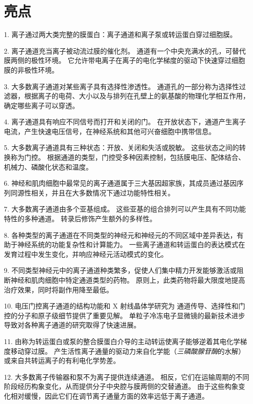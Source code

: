 


\section{亮点}


1. 离子通过两大类完整的膜蛋白：离子通道和离子泵或转运蛋白穿过细胞膜。


2. 离子通道充当离子被动流过膜的催化剂。
通道有一个中央充满水的孔，可替代膜两侧的极性环境。 
它允许带电离子在离子的电化学梯度的驱动下快速穿过细胞膜的非极性环境。


3. 大多数离子通道对某些离子具有选择性渗透性。
通道孔的一部分称为选择性过滤器，根据离子的电荷、大小以及与排列在孔壁上的氨基酸的物理化学相互作用，确定哪些离子可以穿透。


4. 离子通道具有响应不同信号而打开和关闭的门。
在开放状态下，通道产生离子电流，产生快速电压信号，在神经系统和其他可兴奋细胞中携带信息。


5. 大多数离子通道具有三种状态：开放、关闭和失活或脱敏。
这些状态之间的转换称为门控。
根据通道的类型，门控受多种因素控制，包括膜电压、配体结合、机械力、磷酸化状态和温度。


6. 神经和肌肉细胞中最常见的离子通道属于三大基因超家族，其成员通过基因序列同源性相关，并且在大多数情况下通过功能特性相关。


7. 大多数离子通道由多个亚基组成。
这些亚基的组合排列可以产生具有不同功能特性的多种通道。 转录后修饰产生额外的多样性。


8. 各种类型的离子通道在不同类型的神经元和神经元的不同区域中差异表达，有助于神经系统的功能复杂性和计算能力。
一些离子通道和转运蛋白的表达模式在发育过程中发生变化，并响应神经元活动模式的变化。


9. 不同类型神经元中的离子通道种类繁多，促使人们集中精力开发能够激活或阻断神经和肌肉细胞中特定通道类型的药物。
原则上，此类药物将最大限度地提高治疗效果，同时将副作用降至最低。


10. 电压门控离子通道的结构功能和 X 射线晶体学研究为  通道传导、选择性和门控的分子和原子级细节提供了重要见解。
单粒子冷冻电子显微镜的最新技术进步导致对各种离子通道的研究取得了快速进展。


11. 由称为转运蛋白或泵的整合膜蛋白介导的主动转运使离子能够逆着其电化学梯度移动穿过膜。
产生活性离子通量的驱动力来自化学能（\textit{三磷酸腺苷酶}的水解）或来自共转运离子的有利电化学势差。


12. 大多数离子传输器和泵不为离子提供连续通道。
相反，它们在运输周期的不同阶段经历构象变化，从而提供分子中央腔与膜两侧的交替通道。
由于这些构象变化相对缓慢，因此它们在调节离子通量方面的效率远低于离子通道。



